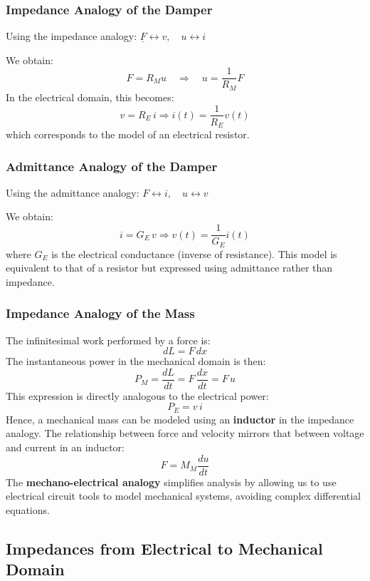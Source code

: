 \subsubsection{Impedance Analogy of the Damper}

Using the impedance analogy: $ \underline{F} \leftrightarrow v,\quad {u} \leftrightarrow i $

We obtain:
\[
{F} = R_M {u} \quad \Rightarrow \quad {u} = \frac{1}{R_M} {F}
\]
In the electrical domain, this becomes:
\[
v = R_E\, i \Rightarrow i(t) = \frac{1}{R_E} v(t)
\]
which corresponds to the model of an electrical resistor.

\subsubsection{Admittance Analogy of the Damper}

Using the admittance analogy: $ {F} \leftrightarrow i,\quad {u} \leftrightarrow v$

We obtain:
\[
i = G_E\, v \Rightarrow v(t) = \frac{1}{G_E} i(t)
\]
where $G_E$ is the electrical conductance (inverse of resistance). This model is equivalent to that of a resistor but expressed using admittance rather than impedance.


\subsubsection*{Impedance Analogy of the Mass}

The infinitesimal work performed by a force is:
\[
dL = F \, dx
\]
The instantaneous power in the mechanical domain is then:
\[
P_M = \frac{dL}{dt} = F \, \frac{dx}{dt} = F \, u
\]
This expression is directly analogous to the electrical power:
\[
P_E = v \, i
\]
Hence, a mechanical mass can be modeled using an \textbf{inductor} in the impedance analogy. The relationship between force and velocity mirrors that between voltage and current in an inductor:
\[
F = M_M \frac{du}{dt}
\]
The \textbf{mechano-electrical analogy} simplifies analysis by allowing us to use electrical circuit tools to model mechanical systems, avoiding complex differential equations.


\subsection{Impedances from Electrical to Mechanical Domain}



